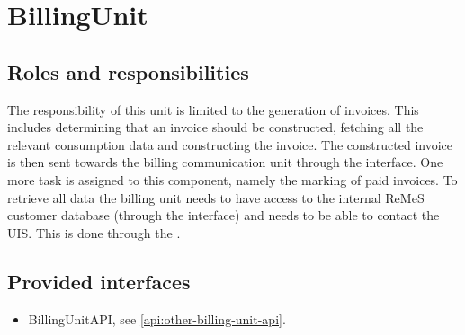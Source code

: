 \section{BillingUnit}
\label{element:billing-unit}

\subsection{Roles and responsibilities}

\npar The responsibility of this unit is limited to the generation of invoices.
This includes determining that an invoice should be constructed, fetching all
the relevant consumption data and constructing the invoice. The constructed
invoice is then sent towards the billing communication unit through the
 interface. One more task is assigned to this
component, namely the marking of paid invoices. To retrieve all data the billing
unit needs to have access to the internal ReMeS
customer database (through the  interface) and
needs to be able to contact the UIS. This is done through the .

\subsection{Provided interfaces}

\begin{itemize}
  \item BillingUnitAPI, see \ref{api:other-billing-unit-api}.
\end{itemize}